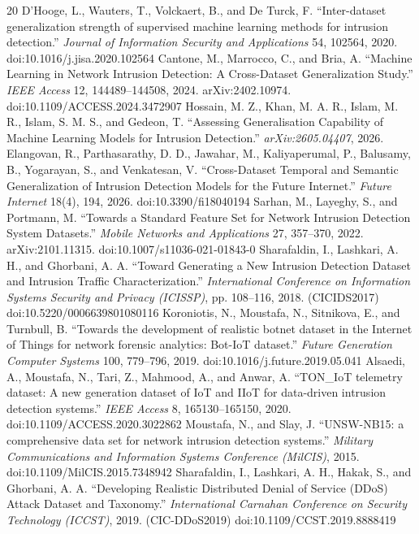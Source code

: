 \documentclass[journal]{IEEEtran}
\begin{document}
\begin{thebibliography}{20}
 D'Hooge, L., Wauters, T., Volckaert, B., and De Turck, F. ``Inter-dataset generalization strength of supervised machine learning methods for intrusion detection.'' \emph{Journal of Information Security and Applications} 54, 102564, 2020. doi:10.1016/j.jisa.2020.102564
 Cantone, M., Marrocco, C., and Bria, A. ``Machine Learning in Network Intrusion Detection: A Cross-Dataset Generalization Study.'' \emph{IEEE Access} 12, 144489--144508, 2024. arXiv:2402.10974. doi:10.1109/ACCESS.2024.3472907
 Hossain, M. Z., Khan, M. A. R., Islam, M. R., Islam, S. M. S., and Gedeon, T. ``Assessing Generalisation Capability of Machine Learning Models for Intrusion Detection.'' \emph{arXiv:2605.04407}, 2026.
 Elangovan, R., Parthasarathy, D. D., Jawahar, M., Kaliyaperumal, P., Balusamy, B., Yogarayan, S., and Venkatesan, V. ``Cross-Dataset Temporal and Semantic Generalization of Intrusion Detection Models for the Future Internet.'' \emph{Future Internet} 18(4), 194, 2026. doi:10.3390/fi18040194
 Sarhan, M., Layeghy, S., and Portmann, M. ``Towards a Standard Feature Set for Network Intrusion Detection System Datasets.'' \emph{Mobile Networks and Applications} 27, 357--370, 2022. arXiv:2101.11315. doi:10.1007/s11036-021-01843-0
 Sharafaldin, I., Lashkari, A. H., and Ghorbani, A. A. ``Toward Generating a New Intrusion Detection Dataset and Intrusion Traffic Characterization.'' \emph{International Conference on Information Systems Security and Privacy (ICISSP)}, pp. 108--116, 2018. (CICIDS2017) doi:10.5220/0006639801080116
 Koroniotis, N., Moustafa, N., Sitnikova, E., and Turnbull, B. ``Towards the development of realistic botnet dataset in the Internet of Things for network forensic analytics: Bot-IoT dataset.'' \emph{Future Generation Computer Systems} 100, 779--796, 2019. doi:10.1016/j.future.2019.05.041
 Alsaedi, A., Moustafa, N., Tari, Z., Mahmood, A., and Anwar, A. ``TON\_IoT telemetry dataset: A new generation dataset of IoT and IIoT for data-driven intrusion detection systems.'' \emph{IEEE Access} 8, 165130--165150, 2020. doi:10.1109/ACCESS.2020.3022862
 Moustafa, N., and Slay, J. ``UNSW-NB15: a comprehensive data set for network intrusion detection systems.'' \emph{Military Communications and Information Systems Conference (MilCIS)}, 2015. doi:10.1109/MilCIS.2015.7348942
 Sharafaldin, I., Lashkari, A. H., Hakak, S., and Ghorbani, A. A. ``Developing Realistic Distributed Denial of Service (DDoS) Attack Dataset and Taxonomy.'' \emph{International Carnahan Conference on Security Technology (ICCST)}, 2019. (CIC-DDoS2019) doi:10.1109/CCST.2019.8888419

\end{thebibliography}
\end{document}
